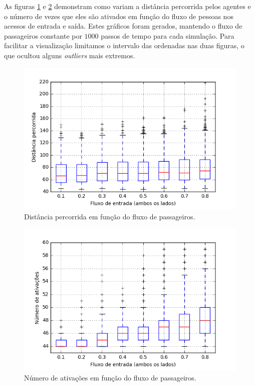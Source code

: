 \documentclass[preprint,12pt]{elsarticle}
\begin{document}
As figuras \ref{fig:dists_boxplot} e \ref{fig:atvs_boxplot} demonstram como variam a distância percorrida pelos agentes e o número de vezes que eles são ativados em função do fluxo de pessoas nos acessos de entrada e saída. Estes gráficos foram gerados, mantendo o fluxo de passageiros constante por $1000$ passos de tempo para cada simulação. Para facilitar a visualização limitamos o intervalo das ordenadas nas duas figuras, o que ocultou alguns \textit{outliers} mais extremos.

\begin{figure}[H]
	\centering
	\includegraphics[totalheight=7cm]{figures/dist_boxplot.png}
	\caption{Distância percorrida em função do fluxo de passageiros.}
	\label{fig:dists_boxplot}
\end{figure}

\begin{figure}[H]
	\centering
	\includegraphics[totalheight=7cm]{figures/ativs_boxplot.png}
	\caption{Número de ativações em função do fluxo de passageiros.}
	\label{fig:atvs_boxplot}
\end{figure}
\end{document}
